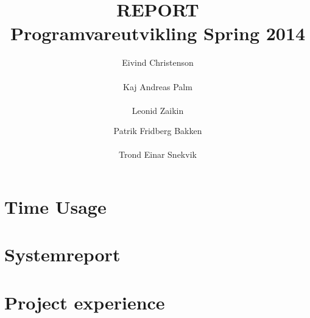 \documentclass[a4paper]{report}
\author{Eivind Christenson \\\\ Kaj Andreas Palm \\\\Leonid Zaikin\and Patrik Fridberg Bakken\\\\ Trond Einar Snekvik}
\title{\MakeUppercase{\bf Report} \\ \Large{Programvareutvikling Spring 2014}}
\date{}
\begin{document}
\maketitle


\tableofcontents
\pagestyle{plain} %
\chapter{Time Usage}
\section{}

\newpage
\chapter{Systemreport}

\chapter{Project experience}

\end{document}
